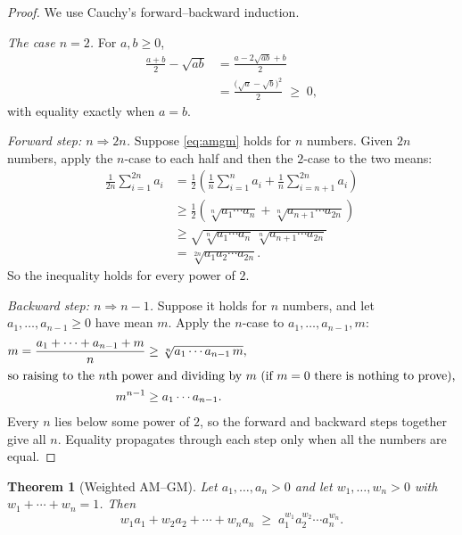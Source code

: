 \documentclass[11pt,a4paper]{article}
\newtheorem{theorem}{Theorem}[section]
\theoremstyle{definition}
\theoremstyle{remark}
\begin{document}
\begin{proof}
We use Cauchy's forward--backward induction.

\emph{The case $n = 2$.} For $a, b \geq 0$,
\begin{align*}
  \frac{a + b}{2} - \sqrt{ab}
    &= \frac{a - 2\sqrt{ab} + b}{2} \\
    &= \frac{\bigl(\sqrt{a} - \sqrt{b}\bigr)^2}{2} \;\geq\; 0,
\end{align*}
with equality exactly when $a = b$.

\emph{Forward step: $n \Rightarrow 2n$.} Suppose \eqref{eq:amgm} holds for $n$ numbers. Given $2n$ numbers, apply the $n$-case to each half and then the $2$-case to the two means:
\begin{align*}
  \frac{1}{2n}\sum_{i=1}^{2n} a_i
    &= \frac{1}{2}\left( \frac{1}{n}\sum_{i=1}^{n} a_i + \frac{1}{n}\sum_{i=n+1}^{2n} a_i \right) \\
    &\geq \frac{1}{2}\left( \sqrt[n]{a_1 \cdots a_n} + \sqrt[n]{a_{n+1} \cdots a_{2n}} \right) \\
    &\geq \sqrt{\sqrt[n]{a_1 \cdots a_n}\,\sqrt[n]{a_{n+1} \cdots a_{2n}}} \\
    &= \sqrt[2n]{a_1 a_2 \cdots a_{2n}}.
\end{align*}
So the inequality holds for every power of $2$.

\emph{Backward step: $n \Rightarrow n - 1$.} Suppose it holds for $n$ numbers, and let $a_1, \dots, a_{n-1} \geq 0$ have mean $m$. Apply the $n$-case to $a_1, \dots, a_{n-1}, m$:
\begin{align*}
  m = \frac{a_1 + \cdots + a_{n-1} + m}{n}
    &\geq \sqrt[n]{a_1 \cdots a_{n-1}\, m}, \\
  \intertext{so raising to the $n$th power and dividing by $m$ (if $m = 0$ there is nothing to prove),}
  m^{n-1} &\geq a_1 \cdots a_{n-1}.
\end{align*}
Every $n$ lies below some power of $2$, so the forward and backward steps together give all $n$. Equality propagates through each step only when all the numbers are equal.
\end{proof}

\begin{theorem}[Weighted AM--GM]\label{thm:wamgm}
Let $a_1, \dots, a_n > 0$ and let $w_1, \dots, w_n > 0$ with $w_1 + \cdots + w_n = 1$. Then
\begin{equation}\label{eq:wamgm}
  w_1 a_1 + w_2 a_2 + \cdots + w_n a_n \;\geq\; a_1^{w_1} a_2^{w_2} \cdots a_n^{w_n}.
\end{equation}
\end{theorem}
\end{document}
